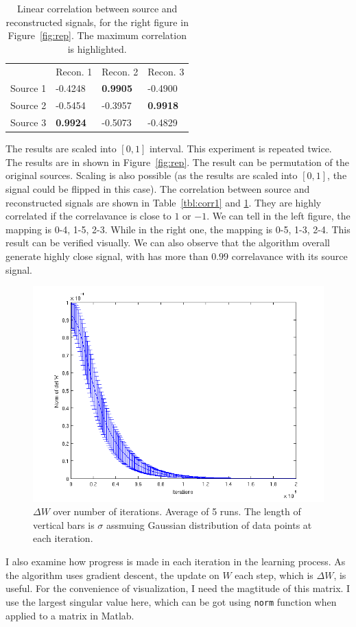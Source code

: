 \documentclass[10pt]{article}
\begin{document}
\begin{table}
\centering
\begin{tabular}{ | l l l l | }
\hline
& Recon. 1& Recon. 2& Recon. 3\\
Source 1&-0.4248& \textbf{0.9905}&-0.4900\\
Source 2&-0.5454&-0.3957& \textbf{0.9918}\\
Source 3&\textbf{0.9924}&-0.5073&-0.4829\\
\hline
\end{tabular}
\caption{Linear correlation between source and reconstructed signals, for
the right figure in Figure~\ref{fig:rep}. The maximum correlation is
highlighted.}
\label{tbl:corr2}
\end{table}

The results are scaled into $[0, 1]$ interval. This experiment is repeated
twice.  The results are in shown in Figure~\ref{fig:rep}. The result can be
permutation of the original sources. Scaling is also possible (as the
results are scaled into $[0, 1]$, the signal could be flipped in this
case). The correlation between source and reconstructed signals are shown in
Table~\ref{tbl:corr1} and \ref{tbl:corr2}. They are highly correlated if
the correlavance is close to $1$ or $-1$. We can tell in the left figure,
the mapping is 0-4, 1-5, 2-3. While in the right one, the mapping is 0-5,
1-3, 2-4. This result can be verified visually. We can also observe that
the algorithm overall generate highly close signal, with has more than
$0.99$ correlavance with its source signal.

\begin{figure}
\centering
\includegraphics[width=.6\textwidth]{detW.png}
\caption{$\Delta W$ over number of iterations. Average of 5 runs. The
length of vertical bars is $\sigma$ assmuing Gaussian distribution of data
points at each iteration.}
\label{fig:detW}
\end{figure}

I also examine how progress is made in each iteration in the learning
process. As the algorithm uses gradient descent, the update on $W$ each
step, which is $\Delta W$, is useful. For the convenience of visualization,
I need the magtitude of this matrix. I use the largest singular value here,
which can be got using \texttt{norm} function when applied to a matrix in
Matlab.
\end{document}
